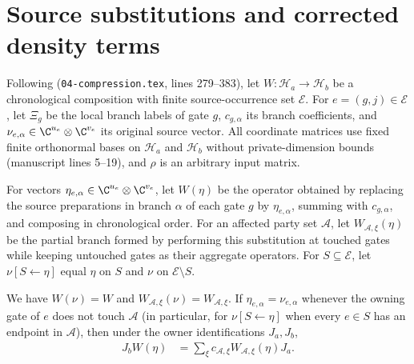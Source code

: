 \section{Source substitutions and corrected density terms}

Following \cite[proof of Theorem~5.2]{OpenAI2026PolynomialPEPS}
(\texttt{04-compression.tex}, lines 279--383),
let $W:\mathcal H_a\to\mathcal H_b$ be a chronological composition with finite
source-occurrence set $\mathcal E$. For $e=(g,j)\in\mathcal E$, let $\Xi_g$ be
the local branch labels of gate $g$, $c_{g,\alpha}$ its branch coefficients,
and $\nu_{e,\alpha}\in\C^{u_e}\otimes\C^{v_e}$ its original source vector. All
coordinate matrices use fixed finite orthonormal bases on $\mathcal H_a$ and
$\mathcal H_b$ without private-dimension bounds (manuscript lines 5--19), and
$\rho$ is an arbitrary input matrix.

\begin{definition}
    \label{def:peps_source_substitution}
    \leanok
    For vectors $\eta_{e,\alpha}\in\C^{u_e}\otimes\C^{v_e}$, let $W(\eta)$ be
    the operator obtained by replacing the source preparations in branch
    $\alpha$ of each gate $g$ by $\eta_{e,\alpha}$, summing with $c_{g,\alpha}$,
    and composing in chronological order. For an affected party set
    $\mathcal A$, let $W_{\mathcal A,\xi}(\eta)$ be the partial branch formed by
    performing this substitution at touched gates while keeping untouched gates
    as their aggregate operators. For $S\subseteq\mathcal E$, let
    $\nu[S\leftarrow\eta]$ equal $\eta$ on $S$ and $\nu$ on
    $\mathcal E\setminus S$.
\end{definition}

\begin{lemma}
    \label{thm:peps_source_substitution_partial}
    \leanok
    We have $W(\nu)=W$ and $W_{\mathcal A,\xi}(\nu)=W_{\mathcal A,\xi}$. If
    $\eta_{e,\alpha}=\nu_{e,\alpha}$ whenever the owning gate of $e$ does not
    touch $\mathcal A$ (in particular, for $\nu[S\leftarrow\eta]$ when every
    $e\in S$ has an endpoint in $\mathcal A$), then under the owner
    identifications $J_a,J_b$,
    \begin{align}
        J_b W(\eta)
         & =\sum_{\xi}c_{\mathcal A,\xi}
        W_{\mathcal A,\xi}(\eta)J_a.
        \label{eq:peps_substitution_partial}
    \end{align}
\end{lemma}

